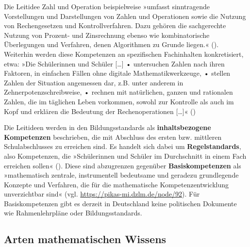 \documentclass[
]{scrbook}
\theoremstyle{definition}
\theoremstyle{definition}
\theoremstyle{definition}
\theoremstyle{definition}
\theoremstyle{remark}
\begin{document}
Die Leitidee Zahl und Operation beispielweise »umfasst sinntragende Vorstellungen und Darstellungen von Zahlen und Operationen sowie die Nutzung von Rechengesetzen und Kontrollverfahren. Dazu gehören die sachgerechte Nutzung von Prozent- und Zinsrechnung ebenso wie kombinatorische Überlegungen und Verfahren, denen Algorithmen zu Grunde liegen.« (). Weiterhin werden diese Kompetenzen an spezifischen Fachinhalten konkretisiert, etwa: »Die Schülerinnen und Schüler {[}\ldots{]} • untersuchen Zahlen nach ihren Faktoren, in einfachen Fällen ohne digitale Mathematikwerkzeuge, • stellen Zahlen der Situation angemessen dar, z.B. unter anderem in Zehnerpotenzschreibweise, • rechnen mit natürlichen, ganzen und rationalen Zahlen, die im täglichen Leben vorkommen, sowohl zur Kontrolle als auch im Kopf und erklären die Bedeutung der Rechenoperationen {[}\ldots{]}« ()

Die Leitideen werden in den Bildungsstandards als \textbf{inhaltsbezogene Kompetenzen} beschrieben, die mit Abschluss des ersten bzw. mittleren Schulabschlusses zu erreichen sind. Es handelt sich dabei um \textbf{Regelstandards}, also Kompetenzen, die »Schülerinnen und Schüler im Durchschnitt in einem Fach erreichen sollen« (). Diese sind abzugrenzen gegenüber \textbf{Basiskompetenzen} als »mathematisch zentrale, instrumentell bedeutsame und geradezu grundlegende Konzepte und Verfahren, die für die mathematische Kompetenzentwicklung unverzichtbar sind« (vgl. \url{https://pikas-mi.dzlm.de/node/92}). Für Basiskompetenzen gibt es derzeit in Deutschland keine politischen Dokumente wie Rahmenlehrpläne oder Bildungsstandards.

\subsection{Arten mathematischen Wissens}\label{arten-mathematischen-wissens}
\end{document}

